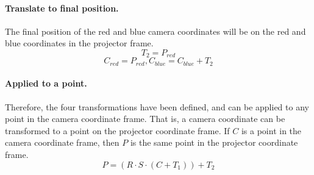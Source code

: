 \documentclass[12pt]{article}
\begin{document}
\paragraph{Translate to final position.} The final position of the red and blue camera coordinates will be on the red and blue coordinates in the projector frame.
\[
T_2 = P_{red}
\]
\[
C_{red} = P_{red},
C_{blue} = C_{blue} + T_2
\]

\paragraph{Applied to a point.} Therefore, the four transformations have been defined, and can be applied to any point in the camera coordinate frame. That is, a camera coordinate can be transformed to a point on the projector coordinate frame. If $C$ is a point in the camera coordinate frame, then $P$ is the same point in the projector coordinate frame.
\[
P = (R \cdot S \cdot (C + T_1)) + T_2
\]
\end{document}
